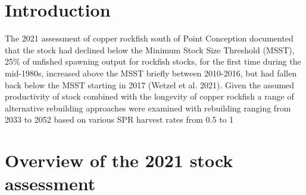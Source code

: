 \documentclass[11pt,
  english,
  a4paper,
]{article}
\begin{document}
\leavevmode\tagmcend\tagstructend\par

\pagebreak
\setlength{\parskip}{5mm plus1mm minus1mm}
\setcounter{page}{1}
\renewcommand{\thefigure}{\arabic{figure}}
\renewcommand{\thetable}{\arabic{table}}
\setcounter{table}{0}
\setcounter{figure}{0}

\setlength\parskip{0.2em plus 0.1em minus 0.2em}


\hypertarget{introduction}{%
\section{Introduction}\label{introduction}}

\leavevmode\tagmcend\tagstructend


The 2021 assessment of copper rockfish south of Point Conception documented that the stock had declined below the Minimum Stock Size Threshold (MSST), 25\% of unfished spawning output for rockfish stocks, for the first time during the mid-1980s, increased above the MSST briefly between 2010-2016, but had fallen back below the MSST starting in 2017 {(Wetzel et al. 2021)\leavevmode\tagmcend\tagstructend}. Given the assumed productivity of stock combined with the longevity of copper rockfish a range of alternative rebuilding approaches were examined with rebuilding ranging from 2033 to 2052 based on various SPR harvest rates from 0.5 to 1

\leavevmode\tagmcend\tagstructend\par


\hypertarget{overview-of-the-2021-stock-assessment}{%
\section{Overview of the 2021 stock assessment}\label{overview-of-the-2021-stock-assessment}}

\leavevmode\tagmcend\tagstructend

\end{document}
